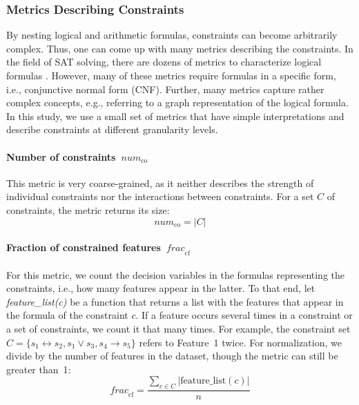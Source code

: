 \subsubsection{Metrics Describing Constraints}
\label{sec:syn:experimental-design:metrics:constraints}

By nesting logical and arithmetic formulas, constraints can become arbitrarily complex.
Thus, one can come up with many metrics describing the constraints.
In the field of SAT solving, there are dozens of metrics to characterize logical formulas \cite{alfonso2014new, nudelman2004understanding}.
However, many of these metrics require formulas in a specific form, i.e., conjunctive normal form (CNF).
Further, many metrics capture rather complex concepts, e.g., referring to a graph representation of the logical formula. 
In this study, we use a small set of metrics that have simple interpretations and describe constraints at different granularity levels.

\paragraph{Number of constraints~$\mathit{num}_{\text{co}}$}

This metric is very coarse-grained, as it neither describes the strength of individual constraints nor the interactions between constraints.
For a set $C$ of constraints, the metric returns its size:
%
\begin{equation}
	\mathit{num}_{\text{co}} = |C|
\end{equation}

\paragraph{Fraction of constrained features~$\mathit{frac}_{\text{cf}}$}

For this metric, we count the decision variables in the formulas representing the constraints, i.e.,  how many features appear in the latter.
To that end, let \emph{feature\_list(c)} be a function that returns a list with the features that appear in the formula of the constraint $c$.
If a feature occurs several times in a constraint or a set of constraints, we count it that many times. 
For example, the constraint set $C=\{s_1 \leftrightarrow s_2, s_1 \lor s_3, s_4 \rightarrow s_5\}$ refers to Feature~1 twice.
For normalization, we divide by the number of features in the dataset, though the metric can still be greater than~1:
%
\begin{equation}
	\mathit{frac}_{\text{cf}} = \frac{\sum_{c \in C} |\text{feature\_list}(c)|}{n}
\end{equation}

